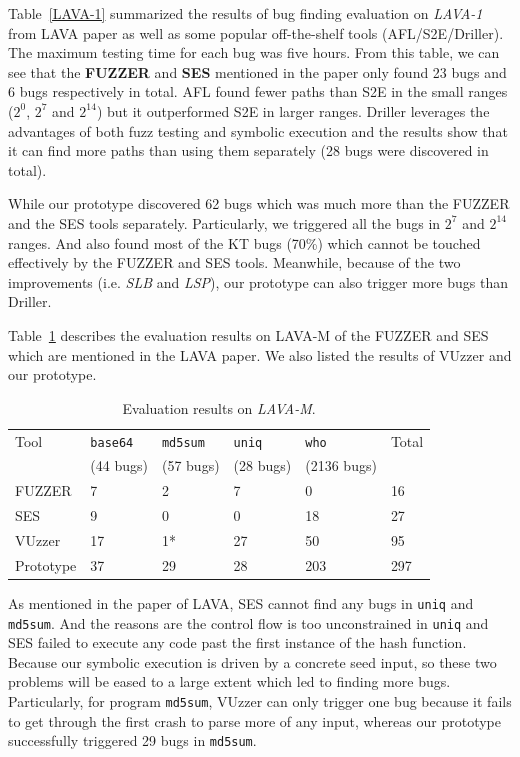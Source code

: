 Table~\ref{LAVA-1} summarized the results of bug finding evaluation on \textit{LAVA-1} from LAVA paper as well as some popular off-the-shelf tools (AFL/S2E/Driller). The maximum testing time for each bug was five hours. From this table, we can see that the \textbf{FUZZER} and \textbf{SES} mentioned in the paper only found 23 bugs and 6 bugs respectively in total. AFL found fewer paths than S2E in the small ranges ($2^0$, $2^7$ and $2^{14}$) but it outperformed S2E in larger ranges. Driller leverages the advantages of both fuzz testing and symbolic execution and the results show that it can find more paths than using them separately (28 bugs were discovered in total).

While our prototype discovered 62 bugs which was much more than the FUZZER and the SES tools separately. Particularly, we triggered all the bugs in $2^7$ and $2^{14}$ ranges. And also found most of the KT bugs (70\%) which cannot be touched effectively by the FUZZER and SES tools. Meanwhile, because of the two improvements (i.e. \textit{SLB} and \textit{LSP}), our prototype can also trigger more bugs than Driller.

Table~\ref{LAVA-M} describes the evaluation results on LAVA-M of the FUZZER and SES which are mentioned in the LAVA paper. We also listed the results of VUzzer and our prototype. 

\begin{table}
  \caption{\label{LAVA-M}Evaluation results on \textit{LAVA-M}.}
  \centering
	\begin{tabular}{p{2cm}<{\centering} p{1.5cm}<{\centering} p{1.5cm}<{\centering}  p{1.5cm}<{\centering} p{1.8cm}<{\centering}  p{1.5cm}<{\centering} }
		\toprule
	    Tool & \texttt{base64} & \texttt{md5sum} & \texttt{uniq} & \texttt{who} & Total  \\
	         & (44 bugs) & (57 bugs) & (28 bugs) & (2136 bugs) &  \\
		\midrule
		FUZZER 		& 7  & 2  & 7    & 0   & 16  \\
		SES	        & 9  & 0  & 0    & 18  & 27  \\
		VUzzer		& 17 & 1* & 27   & 50  & 95 \\
		Prototype	& 37 & 29 & 28   & 203 & 297 \\
	 \bottomrule
	\end{tabular}
\end{table}

As mentioned in the paper of LAVA, SES cannot find any bugs in \texttt{uniq} and \texttt{md5sum}. And the reasons are the control flow is too unconstrained in \texttt{uniq} and SES failed to execute any code past the first instance of the hash function. Because our symbolic execution is driven by a concrete seed input, so these two problems will be eased to a large extent which led to finding more bugs. Particularly, for program \texttt{md5sum}, VUzzer can only trigger one bug because it fails to get through the first crash to parse more of any input, whereas our prototype successfully triggered 29 bugs in \texttt{md5sum}.